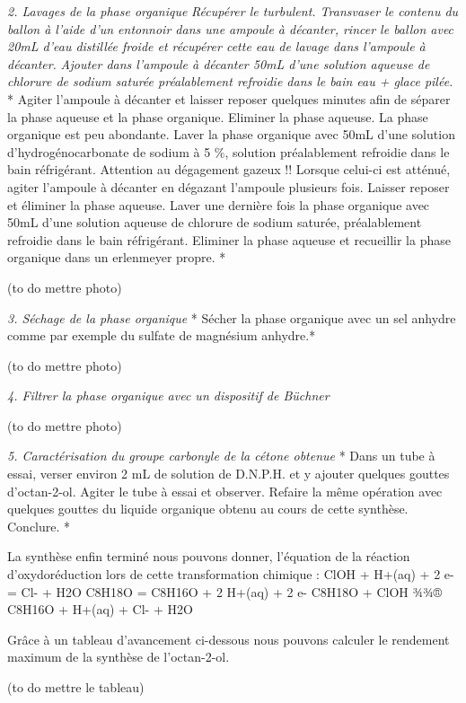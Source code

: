 \emph{2. Lavages de la phase organique} \emph{Récupérer le turbulent.
Transvaser le contenu du ballon à l'aide d'un entonnoir dans une ampoule
à décanter, rincer le ballon avec 20mL d'eau distillée froide et
récupérer cette eau de lavage dans l'ampoule à décanter.} \emph{Ajouter
dans l'ampoule à décanter 50mL d'une solution aqueuse de chlorure de
sodium saturée préalablement refroidie dans le bain eau + glace pilée.}
* Agiter l'ampoule à décanter et laisser reposer quelques minutes afin
de séparer la phase aqueuse et la phase organique. Eliminer la phase
aqueuse. La phase organique est peu abondante.\emph{ } Laver la phase
organique avec 50mL d'une solution d'hydrogénocarbonate de sodium à 5
\%, solution préalablement refroidie dans le bain réfrigérant.\emph{ }
Attention au dégagement gazeux !! Lorsque celui-ci est atténué, agiter
l'ampoule à décanter en dégazant l'ampoule plusieurs fois. Laisser
reposer et éliminer la phase aqueuse.\emph{ } Laver une dernière fois la
phase organique avec 50mL d'une solution aqueuse de chlorure de sodium
saturée, préalablement refroidie dans le bain réfrigérant. Eliminer la
phase aqueuse et recueillir la phase organique dans un erlenmeyer
propre. *

(to do mettre photo)

\emph{3. Séchage de la phase organique} * Sécher la phase organique avec
un sel anhydre comme par exemple du sulfate de magnésium anhydre.*

(to do mettre photo)

\emph{4. Filtrer la phase organique avec un dispositif de Büchner }

(to do mettre photo)

\emph{5. Caractérisation du groupe carbonyle de la cétone obtenue } *
Dans un tube à essai, verser environ 2 mL de solution de D.N.P.H. et y
ajouter quelques gouttes d'octan-2-ol. Agiter le tube à essai et
observer. \emph{ } Refaire la même opération avec quelques gouttes du
liquide organique obtenu au cours de cette synthèse. \emph{ }Conclure. *

La synthèse enfin terminé nous pouvons donner, l'équation de la réaction
d'oxydoréduction lors de cette transformation chimique : ClOH + H+(aq) +
2 e- = Cl- + H2O C8H18O = C8H16O + 2 H+(aq) + 2 e- C8H18O + ClOH ¾¾®
C8H16O + H+(aq) + Cl- + H2O

Grâce à un tableau d'avancement ci-dessous nous pouvons calculer le
rendement maximum de la synthèse de l'octan-2-ol.

(to do mettre le tableau)

